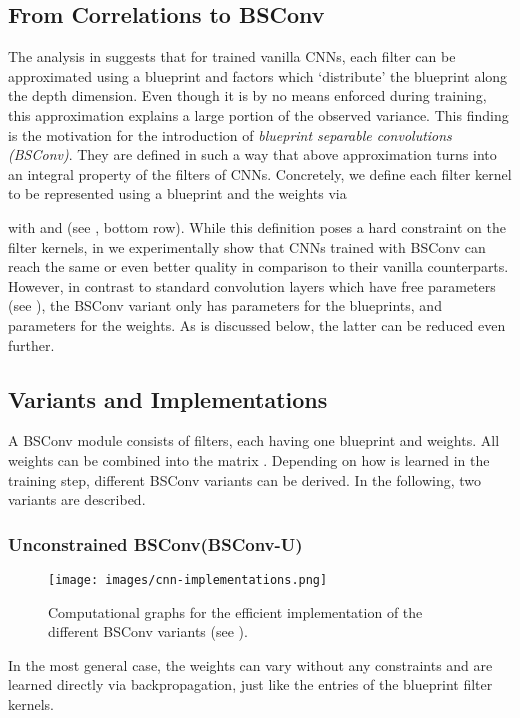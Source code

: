 \documentclass[10pt,twocolumn,letterpaper]{article}
\newcommand{\DCCK}{BSConv\xspace}
\newcommand{\DCCKU}{\DCCK-U\xspace}
\begin{document}
\subsection{From Correlations to \DCCK}
\label{subsec:dcck}
The analysis in  suggests that for trained vanilla CNNs, each  filter can be approximated using a  blueprint and  factors which `distribute' the blueprint along the depth dimension.
Even though it is by no means enforced during training, this approximation explains a large portion of the observed variance.
This finding is the motivation for the introduction of \textit{blueprint separable convolutions (\DCCK)}.
They are defined in such a way that above approximation turns into an integral property of the filters of CNNs.
Concretely, we define each filter kernel  to be represented using a blueprint  and the weights  via

with  and  (see , bottom row).
While this definition poses a hard constraint on the filter kernels, in  we experimentally show that CNNs trained with \DCCK can reach the same or even better quality in comparison to their vanilla counterparts.
However, in contrast to standard convolution layers which have  free parameters (see ), the \DCCK variant only has  parameters for the blueprints, and  parameters for the weights.
As is discussed below, the latter can be reduced even further.

\subsection{Variants and Implementations}
\label{subsec:dcckVariants}
A \DCCK module consists of  filters, each having one blueprint and  weights.
All  weights can be combined into the matrix .
Depending on how  is learned in the training step, different \DCCK variants can be derived.
In the following, two variants are described.

\subsubsection{Unconstrained \DCCK (\DCCKU)}
\label{subsubsec:dcckU}
\begin{figure}
	\center
	\texttt{[image: images/cnn-implementations.png]}
	\caption{Computational graphs for the efficient implementation of the different \DCCK variants (see ).
	}
     \label{fig:cnnImplementationsDcck}
\end{figure}
In the most general case, the weights  can vary without any constraints and are learned directly via backpropagation, just like the entries of the blueprint filter kernels.
\end{document}
